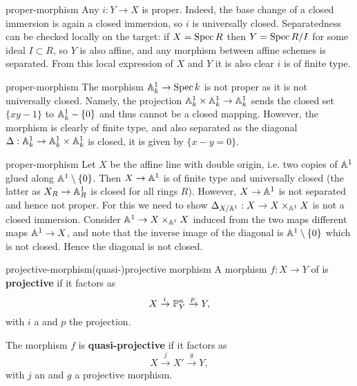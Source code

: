 \begin{example}{proper-morphism}
    Any  $i : Y \to X$ is proper. Indeed, the base change of a closed immersion is again a closed immersion, so $i$ is universally closed. Separatedness can be checked locally on the target: if $X = \Spec R$ then $Y = \Spec R / I$ for some ideal $I \subset R$, so $Y$ is also affine, and any morphism between affine schemes is separated. From this local expression of $X$ and $Y$ it is also clear $i$ is of finite type.
\end{example}

\begin{example}{proper-morphism}
    The morphism $\AA_k^1 \to \Spec k$ is not proper as it is not universally closed. Namely, the projection $\AA^1_k \times \AA^1_k \to \AA^1_k$ sends the closed set $\{ xy - 1 \}$ to $\AA^1_k - \{ 0 \}$ and thus cannot be a closed mapping. However, the morphism is clearly of finite type, and also separated as the diagonal $\Delta : \AA^1_k \to \AA^1_k \times \AA^1_k$ is closed, it is given by $\{ x - y = 0 \}$.
\end{example}

\begin{example}{proper-morphism}
    Let $X$ be the affine line with double origin, i.e. two copies of $\AA^1$ glued along $\AA^1 \setminus \{ 0 \}$. Then $X \to \AA^1$ is of finite type and universally closed (the latter as $X_R \to \AA^1_R$ is closed for all rings $R$). However, $X \to \AA^1$ is not separated and hence not proper. For this we need to show $\Delta_{X / \AA^1} : X \to X \times_{\AA^1} X$ is not a closed immersion. Consider $\AA^1 \to X \times_{\AA^1} X$ induced from the two maps different maps $\AA^1 \to X$, and note that the inverse image of the diagonal is $\AA^1 \setminus \{ 0 \}$ which is not closed. Hence the diagonal is not closed.
\end{example}

\begin{topic}{projective-morphism}{(quasi-)projective morphism}
    A morphism $f : X \to Y$ of  is \textbf{projective} if it factors as
    \[ X \xrightarrow{i} \PP^n_Y \xrightarrow{p} Y , \]
    with $i$ a  and $p$ the projection.
    
    The morphism $f$ is \textbf{quasi-projective} if it factors as
    \[ X \xrightarrow{j} X' \xrightarrow{g} Y , \]
    with $j$ an  and $g$ a projective morphism.
\end{topic}

